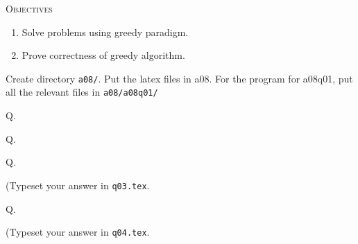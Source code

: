 


\renewcommand\TITLE{Assignment 8}

\newcommand\nextq{
  \addtocounter{qc}{1}
  Q{\theqc}.
  }


\topmatter

\textsc{Objectives}
\begin{enumerate}[nosep]
\item Solve problems using greedy paradigm.
\item Prove correctness of greedy algorithm.
\end{enumerate}

Create directory \verb!a08/!.
Put the latex files in a08.
For the program for a08q01, put all the relevant files in \verb!a08/a08q01/!

\newpage
\nextq


\newpage
\nextq


\newpage
\nextq


(Typeset your answer in \verb!q03.tex!.



\newpage
\nextq


(Typeset your answer in \verb!q04.tex!.




